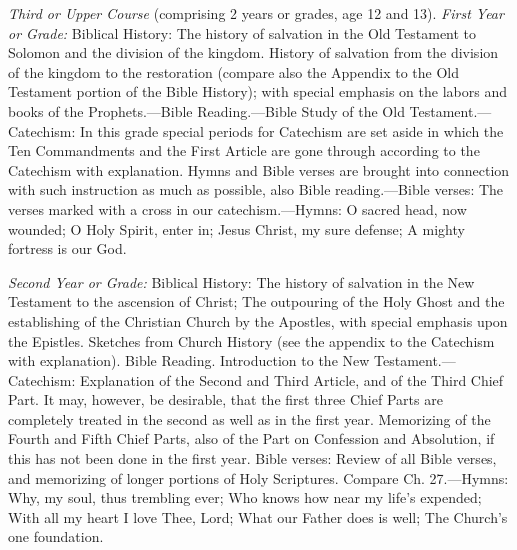 \emph{Third or Upper Course} (comprising 2 years or grades, age 12 and 13). \emph{First Year or Grade:} Biblical History: The history of salvation in the Old Testament to Solomon and the division of the kingdom. History of salvation from the division of the kingdom to the restoration (compare also the Appendix to the Old Testament portion of the Bible History); with special emphasis on the labors and books
of the Prophets.—Bible Reading.—Bible Study of the Old Testament.—Catechism: In this grade special periods for Catechism are set aside in which the Ten Commandments and the First Article are gone through according to the Catechism with explanation. Hymns and Bible verses are brought into connection with such instruction as much as possible, also Bible reading.—Bible verses: The verses marked with a cross in our catechism.—Hymns: O sacred head, now wounded; O Holy Spirit, enter in; Jesus Christ, my sure defense; A mighty fortress is our God.

\emph{Second Year or Grade:} Biblical History: The history of salvation in the New Testament to the ascension of Christ; The outpouring of the Holy Ghost and the establishing of the Christian Church by the Apostles, with special emphasis upon the Epistles. Sketches from Church History (see the appendix to the Catechism with explanation). Bible Reading. Introduction to the New Testament.—Catechism: Explanation of the Second and Third Article, and of the Third Chief Part. It may, however, be desirable, that the first three Chief Parts are completely treated in the second as well as in the first year. Memorizing of the Fourth and Fifth Chief Parts, also of the Part on Confession and Absolution, if this has not been done in the first year. Bible verses: Review of all Bible verses, and memorizing of longer portions of Holy Scriptures. Compare Ch. 27.—Hymns: Why, my soul, thus trembling ever; Who knows how near my life's expended; With all my heart I love Thee, Lord; What our Father does is well; The Church's one foundation.

